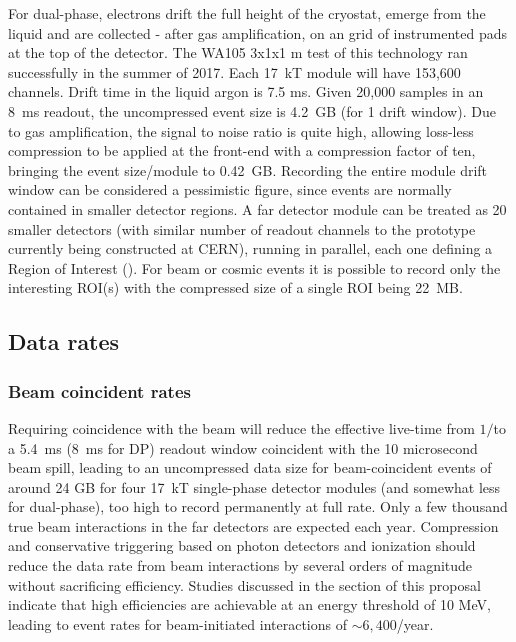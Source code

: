 For dual-phase, electrons drift the full height of the cryostat, emerge from the liquid and are collected - after gas amplification, on an grid of instrumented pads at the top of the detector.  The WA105 3x1x1 m test of this technology ran successfully in the summer of 2017\cite{Murphy:20170516}. 
Each 17~kT module will have 153,600 channels. Drift time in the liquid argon is 7.5 ms. Given 20,000 samples in an 8~ms readout, the uncompressed event size is 4.2~GB (for 1 drift window).  Due to gas amplification, the signal to noise ratio is quite high, allowing loss-less compression to be applied at the front-end  with a compression factor of ten, bringing the event size/module to 0.42~GB. Recording the entire module drift window can be considered a pessimistic figure, since events are normally contained in smaller detector regions. A  far detector module can be treated as 20 smaller  detectors (with similar number  of readout channels to the prototype currently being constructed at CERN), running in parallel, each one defining a Region of Interest  (). For beam or cosmic events it is possible to record only the interesting ROI(s) with the compressed size of a single ROI being 22~MB.

\subsection{Data rates}
\subsubsection{Beam coincident rates}

Requiring  coincidence with the  beam will reduce the effective live-time from $1/$\beamreprate  to a 5.4~ms (8~ms for DP)  readout window coincident with the 10 microsecond beam spill, leading to an uncompressed data size for beam-coincident events of around 24 GB for four 17~kT single-phase detector modules (and somewhat less for dual-phase), too high to record permanently at full rate.
Only a few thousand true beam interactions in the far detectors are expected each year.  Compression and conservative triggering based on photon detectors and ionization should reduce the data rate from beam interactions by several orders of magnitude without sacrificing efficiency.  Studies discussed in the  section of this proposal indicate that high efficiencies are achievable at an energy threshold of 10 MeV, leading to event rates for beam-initiated  interactions of $\sim 6,400$/year.

